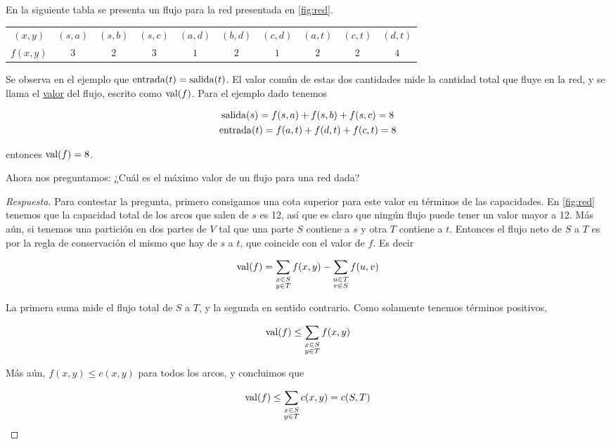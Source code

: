 \begin{ejem}
    En la siguiente tabla se presenta un flujo para la red presentada en \ref{fig:red}.
    
    \begin{tabular}{c|ccccccccc}
        $(x,y)$  & $(s,a)$ & $(s,b)$ & $(s,c)$ & $(a,d)$ & $(b,d)$ & $(c,d)$ & $(a,t)$ & $(c,t)$ & $(d,t)$ \\
        $f(x,y)$ & $3$ & $2$ & $3$ & $1$ & $2$ & $1$ & $2$ & $2$ & $4$
    \end{tabular}
\end{ejem}

Se observa en el ejemplo que $\operatorname{entrada}(t) = \operatorname{salida}(t)$. El valor común de estas dos cantidades mide la cantidad total que fluye en la red, y se llama el \ul{valor} del flujo, escrito como $\operatorname{val}(f)$. Para el ejemplo dado tenemos

\begin{gather*}
    \operatorname{salida}(s) = f(s,a) + f(s,b) + f(s,c) = 8 \\
    \operatorname{entrada}(t) = f(a,t) + f(d,t) + f(c,t) = 8
\end{gather*}

\noindent entonces $\operatorname{val}(f) = 8$.

\begin{pre}
    Ahora nos preguntamos: ¿Cuál es el máximo valor de un flujo para una red dada?
\end{pre}

\begin{proof}[Respuesta]
    Para contestar la pregunta, primero consigamos una cota superior para este valor en términos de las capacidades. En \ref{fig:red} tenemos que la capacidad total de los arcos que salen de $s$ es 12, así que es claro que ningún flujo puede tener un valor mayor a 12. Más aún, si tenemos una partición en dos partes de $V$ tal que una parte $S$ contiene a $s$ y otra $T$ contiene a $t$. Entonces el flujo neto de $S$ a $T$ es por la regla de conservación el mismo que hay de $s$ a $t$, que coincide con el valor de $f$. Es decir
    
    \[
    \operatorname{val}(f) = \sum_{\substack{x\in S \\ y \in T}} f(x,y) - \sum_{\substack{u\in T \\ v \in S}} f(u,v)
    \]
    
    La primera suma mide el flujo total de $S$ a $T$, y la segunda en sentido contrario. Como solamente tenemos términos positivos,
    
    \[
    \operatorname{val}(f) \leq \sum_{\substack{x\in S \\ y \in T}} f(x,y)
    \]
    
    Más aún, $f(x,y) \leq c(x,y)$ para todos los arcos, y concluimos que
    
    \[
    \operatorname{val}(f) \leq \sum_{\substack{x\in S \\ y \in T}} c(x,y) = c(S,T)
    \]
\end{proof}

